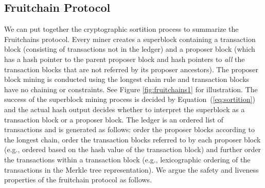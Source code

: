 \documentclass{article}
\newcommand{\pramod}[1]{{\color{red}
\footnotesize[Pramod: #1] }}
\begin{document}
\iffalse
\pramod{
1) explain high level idea of Fruitchains. deconstruction of the blocks' roles. separate transactions (data or fruits/rewards) from the security enabled by the longest chain protocol. This creates two types of blocks. this story is similar to Prism deconstruction story, except voting blocks are not there.

2) then talk about the need to couple the two types of blocks; after all security has to be joint. bring up sortition and 2:1 mining. 

3) next bring up  a  prism 1.0 like structure. Point out why it has optimal CQ, under selfish mining attacks. how about the setting of the threshold for 2:1 mining? what impact does that have on optimal CQ under selfish mining? 

4) now adversary ma deviate from protocol even in publishing tx blocks. it could mine tx blocks in private and then release it at an opportune time. to avoid this, we do reverse pointer from tx blocks to tip of the longest chain. (parent blocks in your language). Summarize the full Fruitchains protocol. does this impact hash threshold setting? if so how? 

5) Give an intuitive argument for the overall security of the fruitchain protocol and optimal CQ. ideally as much  full proof as possible, using the notation and proof results from before.
}
\fi

\subsection*{Fruitchain Protocol}

We can put together the cryptographic sortition process to summarize the Fruitchains protocol. Every miner creates a superblock containing a transaction block (consisting of transactions not in the ledger) and a proposer block (which has a hash pointer to the parent proposer block and hash pointers to {\em all} the transaction blocks that are not referred by its proposer ancestors). The  proposer block mining is conducted using the longest chain rule and transaction blocks have no chaining or constraints.  See Figure \ref{fig:fruitchains1} for illustration. The success of the superblock mining process is decided by Equation~(\ref{eq:sortition}) and the actual hash output decides whether to interpret the superblock as a transaction block or a proposer block.  The ledger is an ordered list of transactions and is generated as follows: order the proposer blocks according to the longest chain,  order the transaction blocks referred to by each proposer block (e.g., ordered based on the hash value of the transaction block) and further order   the transactions within a transaction block (e.g., lexicographic ordering of the transactions in the Merkle tree representation). 
We argue the safety and liveness properties of the fruitchain protocol as follows. 
\end{document}
